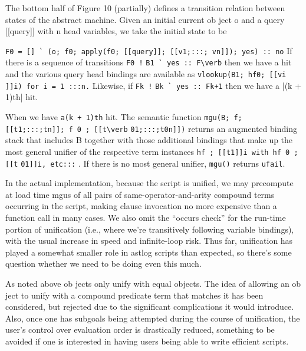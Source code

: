 The bottom half of Figure 10 (partially) defines a
transition relation between states of the abstract machine.
Given an initial current ob ject o and a query
[[query]] with n head variables, we take the initial state
to be

\verb|F0 = [] ` (o; f0; apply(f0; [[query]]; [[v1;:::; vn]]); yes) :: no|
If there is a sequence of transitions
\verb|F0 !|
\verb|B1 ` yes :: F\verb|
then we have a hit and the various query head bindings
are available as \verb|vlookup(B1; hf0; [[vi ]]i) for i = 1 :::n.| Likewise, if
\verb|Fk !|
\verb|Bk ` yes :: Fk+1|
then we have a |(k + 1)th| hit.

When we have \verb|a(k + 1)th| hit.
The semantic function
\verb|mgu(B; f; [[t1;:::;tn]]; f 0 ; [[t\verb|
\verb|01;:::;t0n]])|
returns an augmented binding stack that includes B
together with those additional bindings that make up
the most general unifier of the respective term instances
\verb|hf ; [[t1]]i with hf 0 ; [[t|
\verb|01]]i, etc:::| . If there is no
most general unifier, \verb|mgu()| returns \verb|ufail|.

In the actual implementation, because the script is
unified, we may precompute at load time mgus of all
pairs of same-operator-and-arity compound terms occurring
in the script, making clause invocation no more
expensive than a function call in many cases. We also
omit the ``occurs check'' \cite{SS86} for the run-time portion
of unification (i.e., where we're transitively following
variable bindings), with the usual increase in
speed and infinite-loop risk. Thus far, unification has
played a somewhat smaller role in astlog scripts than
expected, so there's some question whether we need to
be doing even this much.

As noted above ob jects only unify with equal objects.
The idea of allowing an ob ject to unify with
a compound predicate term that matches it has been
considered, but rejected due to the significant complications
it would introduce. Also, once one has subgoals
being attempted during the course of unification, the
user's control over evaluation order is drastically reduced,
something to be avoided if one is interested in
having users being able to write efficient scripts.

\label{crewfig10}

\secup %
